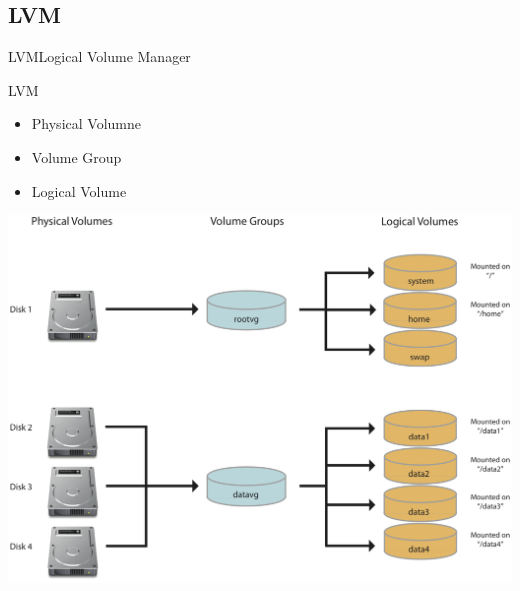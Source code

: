 \documentclass[pdflatex, ngerman]{beamer}
\begin{document}
\subsection{LVM}

\begin{frame}{LVM}{Logical Volume Manager}
\begin{block}{LVM}
\begin{itemize}
	\item Physical Volumne
	\item Volume Group
	\item Logical Volume
\end{itemize}
\end{block}
\end{frame}

\begin{frame}[plain]%
	\centering\colorbox{white}{\includegraphics[height=0.9\textheight]{LVM}}

\end{frame}
\end{document}
